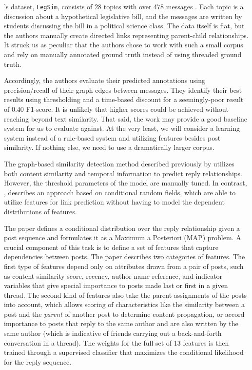 \documentclass[11pt]{article}
\begin{document}
\cite{Wang2008a}'s dataset, \texttt{LegSim}, consists of 28 topics with over 
478 messages . Each topic is a discussion about a hypothetical legislative bill, 
and the messages are written by students discussing the bill in a political science class. 
The data itself is flat, but the authors manually create directed links representing
parent-child relationships. It struck us as peculiar that the authors chose to work
with such a small corpus and rely on manually annotated ground truth instead of using
threaded ground truth.

Accordingly, the authors evaluate their predicted annotations using precision/recall of
their graph edges between messages. They identify their best results using
thresholding and a time-based discount for a seemingly-poor result of 0.40 
F1-score. It is unlikely that higher scores could be achieved without reaching
beyond text similarity. That said, the work may provide a good baseline system
for us to evaluate against. At the very least, we will consider a learning
system instead of a rule-based system and utilizing features besides post
similarity.  If nothing else, we need to use a dramatically larger corpus.

The graph-based similarity detection method described previously by
\cite{Wang2008a} utilizes both content similarity and temporal information to
predict reply relationships. However, the threshold parameters of the model are
manually tuned. In contrast, \cite{Wang2011a}, describes an approach based on conditional random
fields, which are able to utilize features for link prediction
without having to model the dependent distributions of features.

The \cite{Wang2011a} paper defines a conditional distribution over the reply
relationship given a post sequence and formulates it as a Maximum a Posteriori
(MAP) problem. A crucial component of this task is to define a set of features
that capture dependencies between posts. The paper describes two categories of
features. The first type of features depend only on attributes drawn from a pair
of posts, such as content similarity score, recency, author name reference, and
indicator variables that give special importance to posts made last or first in
a given thread. The second kind of features also take the parent assignments of
the posts into account, which allows scoring of characteristics like the
similarity between a post and the \emph{parent} of another post to determine
content propagation, or accord importance to posts that reply to the same author
and are also written by the same author (which is indicative of friends carrying
out a back-and-forth conversation in a thread). The weights for the full set of
13 features is then trained through a supervised classifier that maximizes the
conditional likelihood for the reply sequence.
\end{document}
